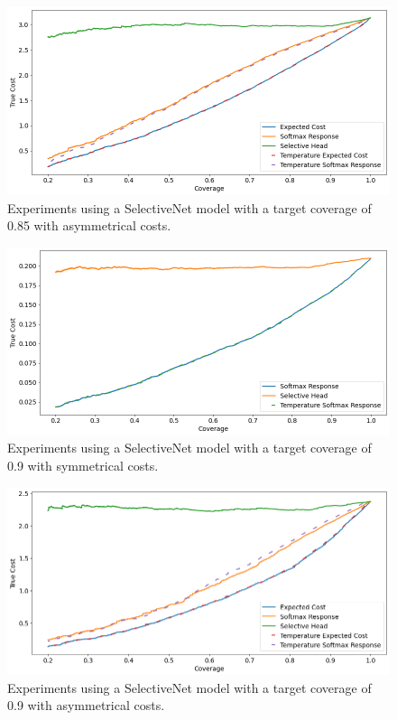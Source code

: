 \begin{figure}[h]
	\includegraphics[width=\textwidth]{images/multi-class/sn0.85-asym.png}
	\caption*{Experiments using a SelectiveNet model with a target coverage of 0.85 with asymmetrical costs.}
\end{figure}

\begin{figure}[h]
	\includegraphics[width=\textwidth]{images/multi-class/sn0.9-sym.png}
	\caption*{Experiments using a SelectiveNet model with a target coverage of 0.9 with symmetrical costs.}
\end{figure}

\begin{figure}[h]
	\includegraphics[width=\textwidth]{images/multi-class/sn0.9-asym.png}
	\caption*{Experiments using a SelectiveNet model with a target coverage of 0.9 with asymmetrical costs.}
\end{figure}

